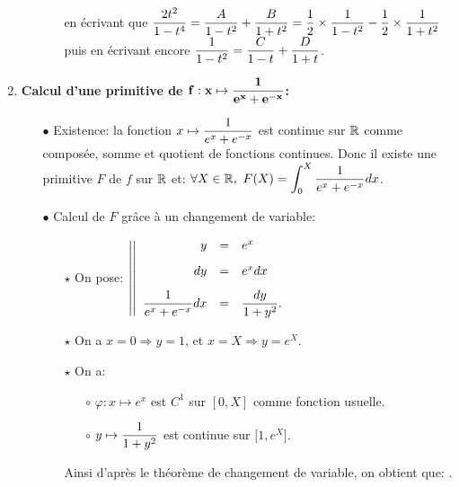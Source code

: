 \documentclass[a4paper, 11pt,reqno]{article}
\begin{document}
\begin{correction}
\begin{enumerate}
\begin{itemize}
\begin{itemize}
				                  en \'ecrivant que $ \displaystyle\frac{2t^2}{1-t^4}=\displaystyle\frac{A}{1-t^2}+\displaystyle\frac{B}{1+t^2}=\displaystyle\frac{1}{2}\times \displaystyle\frac{1}{1-t^2}-\displaystyle\frac{1}{2}\times \displaystyle\frac{1}{1+t^2}$ puis en \'ecrivant encore $\displaystyle\frac{1}{1-t^2}=\displaystyle\frac{C}{1-t}+\displaystyle\frac{D}{1+t}$.
			            \end{itemize}
		      \end{itemize}
		\item \textbf{Calcul d'une primitive de $\mathbf{f: x\mapsto \displaystyle\frac{1}{e^x+e^{-x}}}$:}
		      \begin{itemize}
			      \item[$\bullet$] Existence: la fonction $x\mapsto  \displaystyle\frac{1}{e^x+e^{-x}} $ est continue sur $\mathbb{R}$ comme compos\'ee, somme  et quotient de fonctions continues. Donc il existe une primitive $F$ de $f$ sur $\mathbb{R}$ et: $\forall X\in\mathbb{R},\  \displaystyle F(X)=\int_0^X \displaystyle\frac{1}{e^x+e^{-x}}dx$.
			      \item[$\bullet$] Calcul de $F$ gr\^{a}ce \`{a} un changement de variable:
			            \begin{itemize}
				            \item[$\star$] On pose: $\left| \left|\begin{array}{rll}
						                  y                           & = & e^x \vsec             \\
						                  dy                          & = & e^x dx \vsec          \\
						                  \ddp\frac{1}{e^x+e^{-x}} dx & = & \ddp\frac{dy}{1+y^2}.
					                  \end{array}\right.\right.$
				            \item[$\star$] On a $x=0 \Rightarrow y=1$, et $x=X \Rightarrow y=e^X$.
				            \item[$\star$] On a:
				                  \begin{itemize}
					                  \item[$\circ$] $\varphi: x\mapsto e^x$ est $C^1$ sur $\left\lbrack 0,X \right\rbrack$ comme fonction usuelle.
					                  \item[$\circ$] $y\mapsto  \displaystyle\frac{1}{1+y^2}$ est continue sur $\lbrack 1,e^X \rbrack$.
				                  \end{itemize}
				                  Ainsi d'apr\`{e}s le th\'eor\`{e}me de changement de variable, on obtient que:
				                  .
			            \end{itemize}
		      \end{itemize}
	\end{enumerate}
\end{correction}
\end{document}
